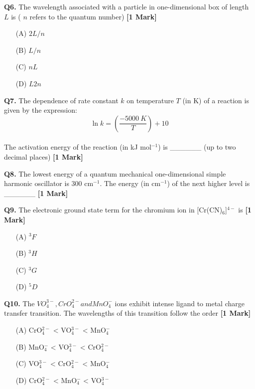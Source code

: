 \documentclass[11pt]{article}
\newcommand{\questiona}[2]{
    \noindent\textbf{Q#2.} #1 \hfill \textbf{[1 Mark]}
}
\begin{document}
\questiona{The wavelength associated with a particle in one-dimensional box of length \( L \) is ( \( n \) refers to the quantum number)}{6}
\begin{enumerate}
    \item[(A)] \( 2L/n \)
    \item[(B)] \( L/n \)
    \item[(C)] \( nL \)
    \item[(D)] \( L2n \)
\end{enumerate}
\vspace{0.5cm}

\questiona{The dependence of rate constant \( k \) on temperature \( T \) (in K) of a reaction is given by the expression: \\ \[ \ln k = \left( \frac{-5000~K}{T} \right) + 10 \] \\ The activation energy of the reaction (in kJ mol\(^{-1}\)) is \_\_\_\_\_\_ (up to two decimal places)}{7}
\vspace{0.5cm}

\questiona{The lowest energy of a quantum mechanical one-dimensional simple harmonic oscillator is 300 cm\(^{-1}\). The energy (in cm\(^{-1}\)) of the next higher level is \_\_\_\_\_\_}{8}
\vspace{0.5cm}

\questiona{The electronic ground state term for the chromium ion in [Cr(CN)\(_6\)]\(^{4-}\) is}{9}
\begin{enumerate}
    \item[(A)] \( ^3F \)
    \item[(B)] \( ^3H \)
    \item[(C)] \( ^3G \)
    \item[(D)] \( ^5D \)
\end{enumerate}
\vspace{0.5cm}

\questiona{The $VO_4^{3-}, CrO_4^{2-} and MnO_4^{-}$ ions exhibit intense ligand to metal charge transfer transition. The wavelengths of this transition follow the order}{10}
\begin{enumerate}
    \item[(A)] CrO\(_4^{2-}\) < VO\(_4^{3-}\) < MnO\(_4^-\)
    \item[(B)] MnO\(_4^-\) < VO\(_4^{3-}\) < CrO\(_4^{2-}\)
    \item[(C)] VO\(_4^{3-}\) < CrO\(_4^{2-}\) < MnO\(_4^-\)
    \item[(D)] CrO\(_4^{2-}\) < MnO\(_4^-\) < VO\(_4^{3-}\)
\end{enumerate}
\vspace{0.5cm}
\end{document}
